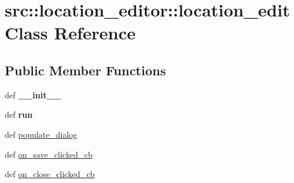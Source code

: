 \hypertarget{classsrc_1_1location__editor_1_1location__edit}{
\section{src::location\_\-editor::location\_\-edit Class Reference}
\label{classsrc_1_1location__editor_1_1location__edit}
}
\subsection*{Public Member Functions}
\begin{DoxyCompactItemize}
\item 
\hypertarget{classsrc_1_1location__editor_1_1location__edit_ad8d5c7337c226b035312efd2d9a0c43c}{
def {\bfseries \_\-\_\-init\_\-\_\-}}
\label{classsrc_1_1location__editor_1_1location__edit_ad8d5c7337c226b035312efd2d9a0c43c}

\item 
\hypertarget{classsrc_1_1location__editor_1_1location__edit_a6a70044e880b99701a253e6c501634aa}{
def {\bfseries run}}
\label{classsrc_1_1location__editor_1_1location__edit_a6a70044e880b99701a253e6c501634aa}

\item 
def \hyperlink{classsrc_1_1location__editor_1_1location__edit_ac348a337a81521caf80058aafe1e4b95}{populate\_\-dialog}
\item 
def \hyperlink{classsrc_1_1location__editor_1_1location__edit_ad3e878ed8c41cacd6233af6f59c61223}{on\_\-save\_\-clicked\_\-cb}
\item 
def \hyperlink{classsrc_1_1location__editor_1_1location__edit_a52ad34e286769e200d0afab9f613847a}{on\_\-close\_\-clicked\_\-cb}
\end{DoxyCompactItemize}
